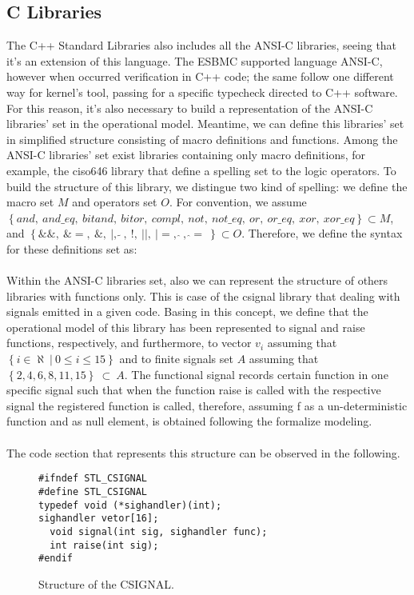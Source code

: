 \documentclass[a4paper]{llncs}
\begin{document}
\subsection{C Libraries}
%
The C++ Standard Libraries also includes all the ANSI-C libraries, seeing that it's an extension of this language. The ESBMC supported language ANSI-C, however when occurred verification in C++ code; the same follow one different way for kernel's tool, passing for a specific typecheck directed to C++ software. For this reason, it's also necessary to build a representation of the ANSI-C libraries' set in the operational model. Meantime, we can define this libraries' set in simplified structure consisting of macro definitions and functions. Among the ANSI-C libraries' set exist libraries containing only macro definitions, for example, the ciso646 library that define a spelling set to the logic operators. To build the structure of this library, we distingue two kind of spelling: we define the macro set $M$ and operators set $O$. For convention, we assume $\left\{and, \: and\_eq, \: bitand, \: bitor, \: compl, \: not, \: not\_eq, \: or, \: or\_eq, \: xor, \: xor\_eq\right\} \subset M$, and $\left\{\&\&, \: \&=, \: \&, \: |, \: \widetilde{} \:, \: !, \: ||, \: |=, \: \widehat{} \:, \: \widehat{}= \: \right\} \subset O$. Therefore, we define the syntax for these definitions set as:
\\\\
Within the ANSI-C libraries set, also we can represent the structure of others libraries with functions only. This is case of the csignal library that dealing with signals emitted in a given code. Basing in this concept, we define that the operational model of this library has been represented to signal and raise functions, respectively, and furthermore, to vector $v_{i}$ assuming that $\left\{ i \in \aleph \:|\: 0 \leq i \leq 15 \right\}$ and to finite signals set $A$ assuming that $\left\{2, 4, 6, 8, 11, 15\right\}\:\subset\:A$. The functional signal records certain function in one specific signal such that when the function raise is called with the respective signal the registered function is called, therefore, assuming f as a un-deterministic function and as null element, is obtained following the formalize modeling.
\\
\\
The code section that represents this structure can be observed in the following.
%

\begin{figure}[ht]
\centering
\begin{minipage}{0.7\textwidth}
\begin{lstlisting}
#ifndef STL_CSIGNAL
#define STL_CSIGNAL
typedef void (*sighandler)(int);
sighandler vetor[16];
  void signal(int sig, sighandler func);
  int raise(int sig);
#endif
\end{lstlisting}
\end{minipage}
\caption{Structure of the CSIGNAL.}
\label{figure:structure-of-the-CSIGNAL}
\end{figure}
\end{document}

